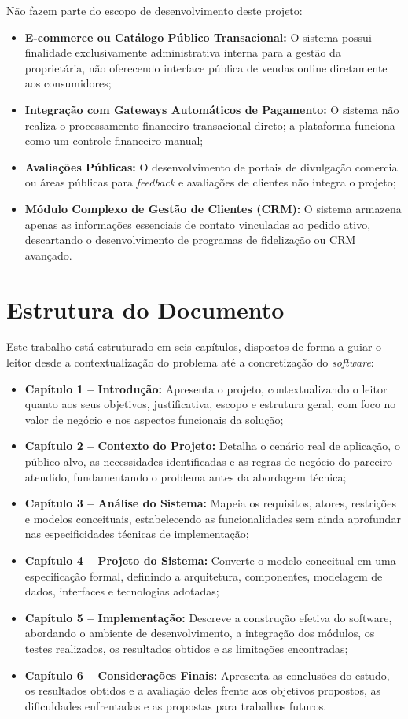 Não fazem parte do escopo de desenvolvimento deste projeto:
\begin{itemize}
    \item \textbf{E-commerce ou Catálogo Público Transacional:} O sistema possui finalidade exclusivamente administrativa interna para a gestão da proprietária, não oferecendo interface pública de vendas online diretamente aos consumidores;
    \item \textbf{Integração com Gateways Automáticos de Pagamento:} O sistema não realiza o processamento financeiro transacional direto; a plataforma funciona como um controle financeiro manual;
    \item \textbf{Avaliações Públicas:} O desenvolvimento de portais de divulgação comercial ou áreas públicas para \textit{feedback} e avaliações de clientes não integra o projeto;
    \item \textbf{Módulo Complexo de Gestão de Clientes (CRM):} O sistema armazena apenas as informações essenciais de contato vinculadas ao pedido ativo, descartando o desenvolvimento de programas de fidelização ou CRM avançado.
\end{itemize}

\section{Estrutura do Documento}
Este trabalho está estruturado em seis capítulos, dispostos de forma a guiar o leitor desde a contextualização do problema até a concretização do \textit{software}:

\begin{itemize}
    \item \textbf{Capítulo 1 -- Introdução:} Apresenta o projeto, contextualizando o leitor quanto aos seus objetivos, justificativa, escopo e estrutura geral, com foco no valor de negócio e nos aspectos funcionais da solução;
    \item \textbf{Capítulo 2 -- Contexto do Projeto:} Detalha o cenário real de aplicação, o público-alvo, as necessidades identificadas e as regras de negócio do parceiro atendido, fundamentando o problema antes da abordagem técnica;
    \item \textbf{Capítulo 3 -- Análise do Sistema:} Mapeia os requisitos, atores, restrições e modelos conceituais, estabelecendo as funcionalidades sem ainda aprofundar nas especificidades técnicas de implementação;
    \item \textbf{Capítulo 4 -- Projeto do Sistema:} Converte o modelo conceitual em uma especificação formal, definindo a arquitetura, componentes, modelagem de dados, interfaces e tecnologias adotadas;
    \item \textbf{Capítulo 5 -- Implementação:} Descreve a construção efetiva do software, abordando o ambiente de desenvolvimento, a integração dos módulos, os testes realizados, os resultados obtidos e as limitações encontradas;
    \item \textbf{Capítulo 6 -- Considerações Finais:} Apresenta as conclusões do estudo, os resultados obtidos e a avaliação deles frente aos objetivos propostos, as dificuldades enfrentadas e as propostas para trabalhos futuros.
\end{itemize}

